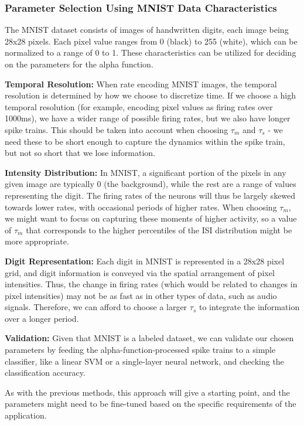 \subsubsection{Parameter Selection Using MNIST Data Characteristics}

The MNIST dataset consists of images of handwritten digits, each image being 28x28 pixels. Each pixel value ranges from 0 (black) to 255 (white), which can be normalized to a range of 0 to 1. These characteristics can be utilized for deciding on the parameters for the alpha function.

\textbf{Temporal Resolution:} When rate encoding MNIST images, the temporal resolution is determined by how we choose to discretize time. If we choose a high temporal resolution (for example, encoding pixel values as firing rates over 1000ms), we have a wider range of possible firing rates, but we also have longer spike trains. This should be taken into account when choosing $\tau_m$ and $\tau_s$ - we need these to be short enough to capture the dynamics within the spike train, but not so short that we lose information.

\textbf{Intensity Distribution:} In MNIST, a significant portion of the pixels in any given image are typically 0 (the background), while the rest are a range of values representing the digit. The firing rates of the neurons will thus be largely skewed towards lower rates, with occasional periods of higher rates. When choosing $\tau_m$, we might want to focus on capturing these moments of higher activity, so a value of $\tau_m$ that corresponds to the higher percentiles of the ISI distribution might be more appropriate.

\textbf{Digit Representation:} Each digit in MNIST is represented in a 28x28 pixel grid, and digit information is conveyed via the spatial arrangement of pixel intensities. Thus, the change in firing rates (which would be related to changes in pixel intensities) may not be as fast as in other types of data, such as audio signals. Therefore, we can afford to choose a larger $\tau_s$ to integrate the information over a longer period.

\textbf{Validation:} Given that MNIST is a labeled dataset, we can validate our chosen parameters by feeding the alpha-function-processed spike trains to a simple classifier, like a linear SVM or a single-layer neural network, and checking the classification accuracy.

As with the previous methods, this approach will give a starting point, and the parameters might need to be fine-tuned based on the specific requirements of the application.


